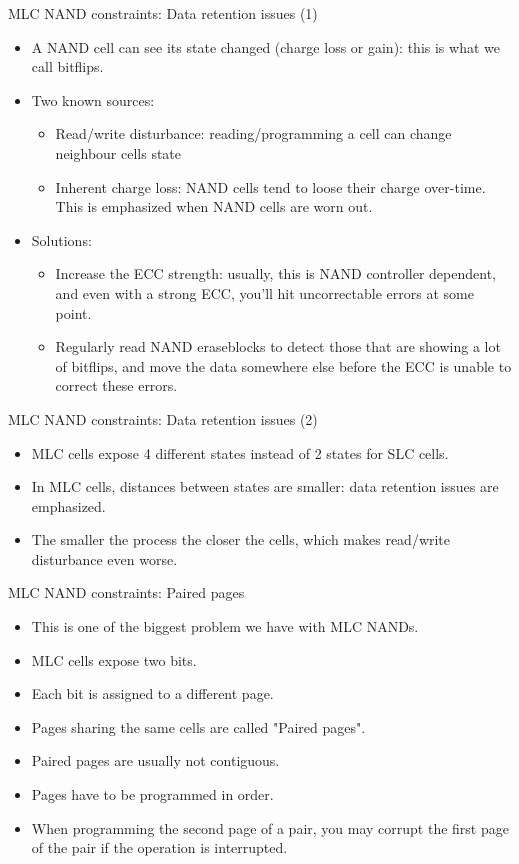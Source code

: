\documentclass[aspectratio=169,obeyspaces,spaces,hyphens,dvipsnames]{beamer}
\begin{document}
\begin{frame}{MLC NAND constraints: Data retention issues (1)}
  \begin{itemize}
  \item A NAND cell can see its state changed (charge loss or gain):
	this is what we call bitflips.
  \item Two known sources:
    \begin{itemize}
    \item Read/write disturbance: reading/programming a cell can
	  change neighbour cells state
    \item Inherent charge loss: NAND cells tend to loose their
	  charge over-time. This is emphasized when NAND cells are
	  worn out.
    \end{itemize}
  \item Solutions:
    \begin{itemize}
    \item Increase the ECC strength: usually, this is NAND controller
	  dependent, and even with a strong ECC, you'll hit
	  uncorrectable errors at some point.
    \item Regularly read NAND eraseblocks to detect those that are
	  showing a lot of bitflips, and move the data somewhere else
	  before the ECC is unable to correct these errors.
    \end{itemize}
  \end{itemize}
\end{frame}

\begin{frame}{MLC NAND constraints: Data retention issues (2)}
  \begin{itemize}
  \item MLC cells expose 4 different states instead of 2 states for
	SLC cells.
  \item In MLC cells, distances between states are smaller: data
	retention issues are emphasized.
  \item The smaller the process the closer the cells, which makes
	read/write disturbance even worse.
  \end{itemize}
\end{frame}

\begin{frame}{MLC NAND constraints: Paired pages}
  \begin{itemize}
  \item This is one of the biggest problem we have with MLC NANDs.
  \item MLC cells expose two bits.
  \item Each bit is assigned to a different page.
  \item Pages sharing the same cells are called "Paired pages".
  \item Paired pages are usually not contiguous.
  \item Pages have to be programmed in order.
  \item When programming the second page of a pair, you may corrupt
	the first page of the pair if the operation is interrupted.
  \end{itemize}
\end{frame}
\end{document}
